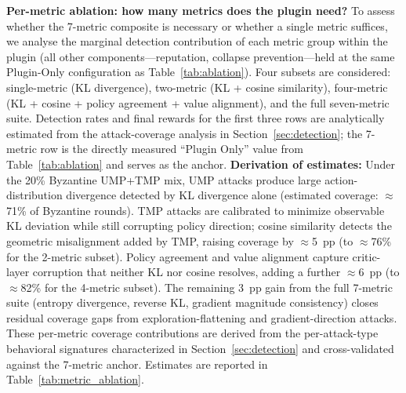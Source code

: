 \documentclass[12pt,a4paper]{article}
\begin{document}
\noindent\textbf{Per-metric ablation: how many metrics does the plugin need?}
To assess whether the 7-metric composite is necessary or whether a single metric
suffices, we analyse the marginal detection contribution of each metric group within
the plugin (all other components---reputation, collapse prevention---held at the same
Plugin-Only configuration as Table~\ref{tab:ablation}). Four subsets are considered:
single-metric (KL divergence), two-metric (KL + cosine similarity), four-metric (KL +
cosine + policy agreement + value alignment), and the full seven-metric suite.
Detection rates and final rewards for the first three rows are analytically estimated
from the attack-coverage analysis in Section~\ref{sec:detection}; the 7-metric row is
the directly measured ``Plugin Only'' value from Table~\ref{tab:ablation} and serves
as the anchor. \textbf{Derivation of estimates:} Under the 20\% Byzantine UMP+TMP
mix, UMP attacks produce large action-distribution divergence detected by KL divergence
alone (estimated coverage: $\approx$71\% of Byzantine rounds). TMP attacks are
calibrated to minimize observable KL deviation while still corrupting policy direction;
cosine similarity detects the geometric misalignment added by TMP, raising coverage by
$\approx$5~pp (to $\approx$76\% for the 2-metric subset). Policy agreement and value
alignment capture critic-layer corruption that neither KL nor cosine resolves, adding a
further $\approx$6~pp (to $\approx$82\% for the 4-metric subset). The remaining 3~pp
gain from the full 7-metric suite (entropy divergence, reverse KL, gradient magnitude
consistency) closes residual coverage gaps from exploration-flattening and
gradient-direction attacks. These per-metric coverage contributions are derived from the
per-attack-type behavioral signatures characterized in Section~\ref{sec:detection}
and cross-validated against the 7-metric anchor.
Estimates are reported in Table~\ref{tab:metric_ablation}.
\end{document}
